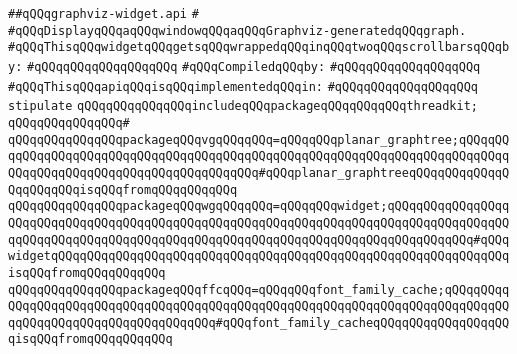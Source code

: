 \label{src/lib/x-kit/widget/old/fancy/graphviz/graphviz-widget.api}
\verb|##qQQqgraphviz-widget.api|\newline
\verb|#|\newline
\verb|#qQQqDisplayqQQqaqQQqwindowqQQqaqQQqGraphviz-generatedqQQqgraph.|\newline
\verb|#qQQqThisqQQqwidgetqQQqgetsqQQqwrappedqQQqinqQQqtwoqQQqscrollbarsqQQqby:|\newline
\verb|#qQQqqQQqqQQqqQQqqQQq|\newline
\newline
\verb|#qQQqCompiledqQQqby:|\newline
\verb|#qQQqqQQqqQQqqQQqqQQq|\newline
\newline
\verb|#qQQqThisqQQqapiqQQqisqQQqimplementedqQQqin:|\newline
\verb|#qQQqqQQqqQQqqQQqqQQq|\newline
\newline
\verb|stipulate|\newline
\verb|qQQqqQQqqQQqqQQqincludeqQQqpackageqQQqqQQqqQQqthreadkit;|\newline
\verb|qQQqqQQqqQQqqQQq#|\newline
\verb|qQQqqQQqqQQqqQQqpackageqQQqvgqQQqqQQq=qQQqqQQqplanar_graphtree;qQQqqQQqqQQqqQQqqQQqqQQqqQQqqQQqqQQqqQQqqQQqqQQqqQQqqQQqqQQqqQQqqQQqqQQqqQQqqQQqqQQqqQQqqQQqqQQqqQQqqQQqqQQqqQQq#qQQqplanar_graphtreeqQQqqQQqqQQqqQQqqQQqqQQqisqQQqfromqQQqqQQqqQQq|\newline
\verb|qQQqqQQqqQQqqQQqpackageqQQqwgqQQqqQQq=qQQqqQQqwidget;qQQqqQQqqQQqqQQqqQQqqQQqqQQqqQQqqQQqqQQqqQQqqQQqqQQqqQQqqQQqqQQqqQQqqQQqqQQqqQQqqQQqqQQqqQQqqQQqqQQqqQQqqQQqqQQqqQQqqQQqqQQqqQQqqQQqqQQqqQQqqQQqqQQqqQQq#qQQqwidgetqQQqqQQqqQQqqQQqqQQqqQQqqQQqqQQqqQQqqQQqqQQqqQQqqQQqqQQqqQQqqQQqisqQQqfromqQQqqQQqqQQq|\newline
\verb|qQQqqQQqqQQqqQQqpackageqQQqffcqQQq=qQQqqQQqfont_family_cache;qQQqqQQqqQQqqQQqqQQqqQQqqQQqqQQqqQQqqQQqqQQqqQQqqQQqqQQqqQQqqQQqqQQqqQQqqQQqqQQqqQQqqQQqqQQqqQQqqQQqqQQqqQQq#qQQqfont_family_cacheqQQqqQQqqQQqqQQqqQQqisqQQqfromqQQqqQQqqQQq|\newline
